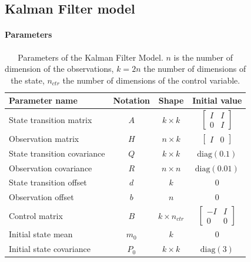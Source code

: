 \documentclass{article}
\let\Oldsubsection\subsection
\renewcommand{\subsection}{\FloatBarrier\Oldsubsection}
\begin{document}
\subsection{Kalman Filter model}

\paragraph{Parameters}

\begin{table}[H]
\caption{Parameters of the Kalman Filter Model. $n$ is the number of dimension of the observations, $k = 2n$ the number of dimensions of the state, $n_{ctr}$ the number of dimensions of the control variable.}
\label{table:parameters}
\vspace{5pt}
\centering
\begin{tabular}{l c c c}
\toprule
    \bfseries Parameter name & \bfseries Notation & \bfseries Shape & \bfseries Initial value\\
    \hline
    \noalign{\vspace{4pt}}
    State transition matrix & $A$ & $k \times k$ & $\begin{bmatrix}I & I \\ 0 & I\end{bmatrix}$ \\
    \noalign{\vspace{4pt}}
    Observation matrix & $H$ & $n \times k$ & $\begin{bmatrix}I & 0 \end{bmatrix}$ \\
    \noalign{\vspace{4pt}}
    State transition covariance & $Q$ & $k \times k$ & $\text{diag}(0.1)$ \\
    \noalign{\vspace{4pt}}
    Observation covariance & $R$ & $n \times n$ & $\text{diag}(0.01)$\\
    \noalign{\vspace{4pt}}
    State transition offset & $d$ & $k$ & 0 \\
    \noalign{\vspace{4pt}}
    Observation offset & $b$ & $n$ & 0 \\
    \noalign{\vspace{4pt}}
    Control matrix & $B$ & $k \times n_{ctr}$ & $\begin{bmatrix} -I & I \\ 0 & 0 \end{bmatrix}$ \\
    \noalign{\vspace{4pt}}
    Initial state mean & $m_0$ & $k$ & $0$ \\
    \noalign{\vspace{4pt}}
    Initial state covariance & $P_0$ & $k \times k$ & $\text{diag}(3)$ \\
\bottomrule
\end{tabular}
\end{table}
\end{document}
